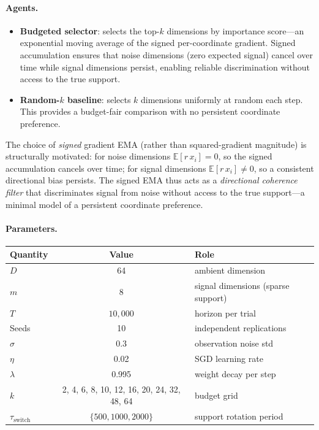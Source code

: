 \documentclass[12pt,a4paper,openany]{book}
\begin{document}
\paragraph{Agents.}
\begin{itemize}
\item \textbf{Budgeted selector}: selects the top-$k$
  dimensions by importance score---an exponential moving
  average of the signed per-coordinate gradient.  Signed
  accumulation ensures that noise dimensions (zero expected
  signal) cancel over time while signal dimensions persist,
  enabling reliable discrimination without access to the true
  support.
\item \textbf{Random-$k$ baseline}: selects $k$ dimensions
  uniformly at random each step.  This provides a
  budget-fair comparison with no persistent coordinate preference.
\end{itemize}

\noindent
The choice of \emph{signed} gradient EMA (rather than
squared-gradient magnitude) is structurally motivated:
for noise dimensions $\mathbb{E}[r\,x_i] = 0$, so the
signed accumulation cancels over time; for signal
dimensions $\mathbb{E}[r\,x_i] \neq 0$, so a consistent
directional bias persists.  The signed EMA thus acts as a
\emph{directional coherence filter} that discriminates
signal from noise without access to the true support---a
minimal model of a persistent coordinate preference.

\paragraph{Parameters.}
\begin{center}
\small
\begin{tabular}{@{}lcl@{}}
\toprule
\textbf{Quantity} & \textbf{Value} & \textbf{Role} \\
\midrule
$D$ & 64 & ambient dimension \\
$m$ & 8  & signal dimensions (sparse support) \\
$T$ & $10{,}000$ & horizon per trial \\
Seeds & 10 & independent replications \\
$\sigma$ & 0.3 & observation noise std \\
$\eta$ & 0.02 & SGD learning rate \\
$\lambda$ & 0.995 & weight decay per step \\
$k$ & 2, 4, 6, 8, 10, 12, 16, 20, 24, 32, 48, 64
  & budget grid \\
$\tau_{\mathrm{switch}}$ & $\{500, 1000, 2000\}$
  & support rotation period \\
\bottomrule
\end{tabular}
\end{center}
\end{document}
